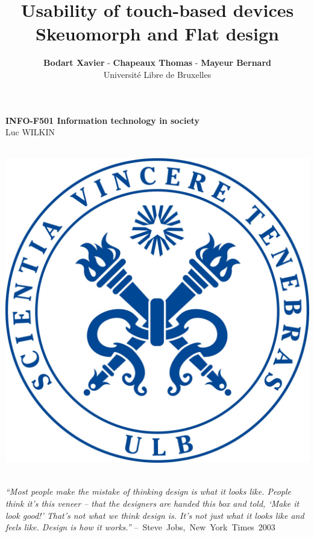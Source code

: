 \documentclass[a4paper,11pt] {article}
\theoremstyle{definition}
\begin{document}
\title{\textbf{Usability of touch-based devices \\ Skeuomorph and Flat design}}
\author{\textbf{Bodart Xavier} - \textbf{Chapeaux Thomas} - \textbf{Mayeur Bernard} \\
Université Libre de Bruxelles}

\maketitle
\begin{center}

\textbf{INFO-F501 Information technology in society} \\
Luc WILKIN
\end{center}
\begin{center}

~\\

\includegraphics[scale=0.15]{fig-report/ULBjea.jpg}

~\\

\textit{“Most people make the mistake of thinking design is what it looks like. People think it’s this veneer – that the designers are handed this box and told, ‘Make it look good!’ That’s not what we think design is. It’s not just what it looks like and feels like. Design is how it works.”} \mbox{– Steve Jobs, New York Times 2003}

\end{center}
\end{document}
